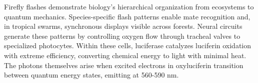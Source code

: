 Firefly flashes demonstrate biology's hierarchical organization from ecosystems to quantum mechanics. Species-specific flash patterns enable mate recognition and, in tropical swarms, synchronous displays visible across forests. Neural circuits generate these patterns by controlling oxygen flow through tracheal valves to specialized photocytes. Within these cells, luciferase catalyzes luciferin oxidation with extreme efficiency, converting chemical energy to light with minimal heat. The photons themselves arise when excited electrons in oxyluciferin transition between quantum energy states, emitting at 560-590 nm. 
